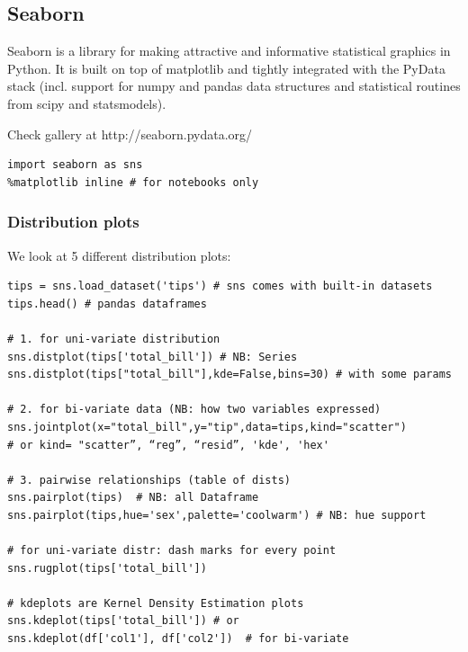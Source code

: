 \documentclass[12pt]{article}
\begin{document}
\subsection{Seaborn}
Seaborn is a library for making attractive and informative statistical graphics in Python. It is built on top of matplotlib and tightly integrated with the PyData stack (incl. support for numpy and pandas data structures and statistical routines from scipy and statsmodels).

Check gallery at http://seaborn.pydata.org/
\begin{lstlisting}
import seaborn as sns
%matplotlib inline # for notebooks only
\end{lstlisting}


\subsubsection{Distribution plots}
We look at 5 different distribution plots:
\begin{lstlisting}
tips = sns.load_dataset('tips') # sns comes with built-in datasets
tips.head() # pandas dataframes

# 1. for uni-variate distribution
sns.distplot(tips['total_bill']) # NB: Series
sns.distplot(tips["total_bill"],kde=False,bins=30) # with some params

# 2. for bi-variate data (NB: how two variables expressed)
sns.jointplot(x="total_bill",y="tip",data=tips,kind="scatter")
# or kind= "scatter”, “reg”, “resid”, 'kde', 'hex'

# 3. pairwise relationships (table of dists)
sns.pairplot(tips)  # NB: all Dataframe
sns.pairplot(tips,hue='sex',palette='coolwarm') # NB: hue support

# for uni-variate distr: dash marks for every point 
sns.rugplot(tips['total_bill'])

# kdeplots are Kernel Density Estimation plots
sns.kdeplot(tips['total_bill']) # or
sns.kdeplot(df['col1'], df['col2'])  # for bi-variate
\end{lstlisting}

\end{document}
